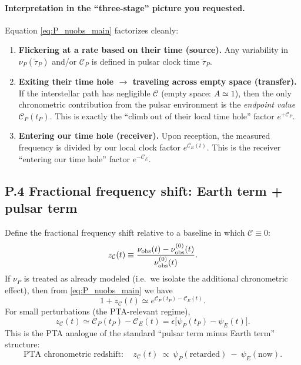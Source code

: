 \documentclass[10pt]{article}
\newcommand{\Eclk}{E}
\begin{document}
\paragraph{Interpretation in the ``three-stage'' picture you requested.}
Equation \eqref{eq:P_nuobs_main} factorizes cleanly:
\begin{enumerate}[leftmargin=1.2em]
\item \textbf{Flickering at a rate based on their time (source).}
Any variability in $\nu_P(\tilde\tau_P)$ and/or $\mathcal{C}_P$ is defined in pulsar clock time $\tilde\tau_P$.

\item \textbf{Exiting their time hole $\rightarrow$ traveling across empty space (transfer).}
If the interstellar path has negligible $\mathcal{C}$ (empty space: $A\simeq 1$), then the only
chronometric contribution from the pulsar environment is the \emph{endpoint value} $\mathcal{C}_P(t_P)$.
This is exactly the ``climb out of their local time hole'' factor $e^{+\mathcal{C}_P}$.

\item \textbf{Entering our time hole (receiver).}
Upon reception, the measured frequency is divided by our local clock factor $e^{\mathcal{C}_E(t)}$.
This is the receiver ``entering our time hole'' factor $e^{-\mathcal{C}_E}$.
\end{enumerate}

\subsection{P.4 Fractional frequency shift: Earth term + pulsar term}
\label{app:pta:redshift}

Define the fractional frequency shift relative to a baseline in which $\mathcal{C}\equiv 0$:
\begin{equation}
z_\mathcal{C}(t)
\equiv
\frac{\nu_{\rm obs}(t)-\nu_{\rm obs}^{(0)}(t)}{\nu_{\rm obs}^{(0)}(t)}.
\label{eq:P_z_def}
\end{equation}
If $\nu_P$ is treated as already modeled (i.e.\ we isolate the additional chronometric effect),
then from \eqref{eq:P_nuobs_main} we have
\begin{equation}
1+z_\mathcal{C}(t) \simeq e^{\mathcal{C}_P(t_P)-\mathcal{C}_{\Eclk}(t)}.
\label{eq:P_z_exact}
\end{equation}
For small perturbations (the PTA-relevant regime),
\begin{equation}
z_\mathcal{C}(t) \simeq \mathcal{C}_P(t_P)-\mathcal{C}_{\Eclk}(t)
= \epsilon\bigl[\psi_P(t_P)-\psi_{\Eclk}(t)\bigr].
\label{eq:P_z_linear}
\end{equation}
This is the PTA analogue of the standard ``pulsar term minus Earth term'' structure:
\begin{equation}
\boxed{
\text{PTA chronometric redshift}:\quad
z_\mathcal{C}(t)\ \propto\ \psi_P(\text{retarded})\ -\ \psi_E(\text{now}).
}
\end{equation}
\end{document}
